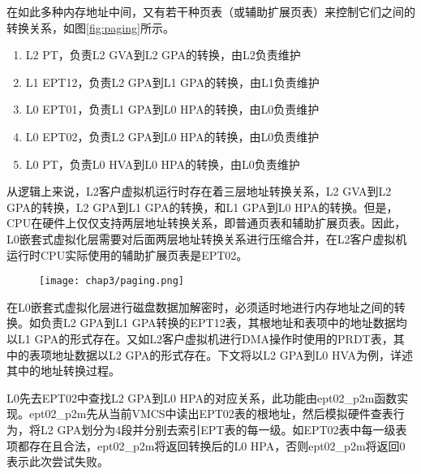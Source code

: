 在如此多种内存地址中间，又有若干种页表（或辅助扩展页表）来控制它们之间的转换关系，如图\ref{fig:paging}所示。

\begin{enumerate}
\item L2 PT，负责L2 GVA到L2 GPA的转换，由L2负责维护
\item L1 EPT12，负责L2 GPA到L1 GPA的转换，由L1负责维护
\item L0 EPT01，负责L1 GPA到L0 HPA的转换，由L0负责维护
\item L0 EPT02，负责L2 GPA到L0 HPA的转换，由L0负责维护
\item L0 PT，负责L0 HVA到L0 HPA的转换，由L0负责维护
\end{enumerate}

从逻辑上来说，L2客户虚拟机运行时存在着三层地址转换关系，L2 GVA到L2 GPA的转换，L2 GPA到L1 GPA的转换，和L1 GPA到L0 HPA的转换。但是，CPU在硬件上仅仅支持两层地址转换关系，即普通页表和辅助扩展页表。因此，L0嵌套式虚拟化层需要对后面两层地址转换关系进行压缩合并，在L2客户虚拟机运行时CPU实际使用的辅助扩展页表是EPT02。

\begin{figure}[!htbp]
  \centering
  \texttt{[image: chap3/paging.png]}
\end{figure}

在L0嵌套式虚拟化层进行磁盘数据加解密时，必须适时地进行内存地址之间的转换。如负责L2 GPA到L1 GPA转换的EPT12表，其根地址和表项中的地址数据均以L1 GPA的形式存在。又如L2客户虚拟机进行DMA操作时使用的PRDT表，其中的表项地址数据以L2 GPA的形式存在。下文将以L2 GPA到L0 HVA为例，详述其中的地址转换过程。

L0先去EPT02中查找L2 GPA到L0 HPA的对应关系，此功能由ept02\_p2m函数实现。ept02\_p2m先从当前VMCS中读出EPT02表的根地址，然后模拟硬件查表行为，将L2 GPA划分为4段并分别去索引EPT表的每一级。如EPT02表中每一级表项都存在且合法，ept02\_p2m将返回转换后的L0 HPA，否则ept02\_p2m将返回0表示此次尝试失败。

